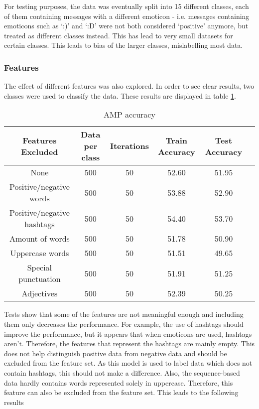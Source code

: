 \noindent For testing purposes, the data was eventually split into 15 different classes, each of them containing messages with a different emoticon - i.e. messages containing emoticons such as `:)' and `:D' were not both considered `positive' anymore, but treated as different classes instead. This has lead to very small datasets for certain classes. This leads to bias of the larger classes, mislabelling most data.


\subsubsection*{Features}

The effect of different features was also explored. In order to see clear results, two classes were used to classify the data. These results are displayed in table \ref{table:AMPfeatures}.

\begin{table}[h!]
\begin{center}
\begin{tabular}{| c | c | c | c | c | c |}
\hline
 {\textbf{Features Excluded}} 	 
 & {\textbf{Data per class}} 					& {\textbf{Iterations}} 
 & {\textbf{Train Accuracy}} 					& {\textbf{Test Accuracy}} 
 \\
\hline
None		&				500	&	50	&	52.60	& 	51.95	\\
Positive/negative words	&		500	&	50	&	53.88	&	52.90	\\
Positive/negative hashtags	&	500	&	50	&	54.40	&	53.70	\\
Amount of words	&		500	&	50	&	51.78	&	50.90	\\
Uppercase words	&		500	&	50	&	51.51	&	49.65	\\
Special punctuation	&	500	&	50	&	51.91	&	51.25	\\
Adjectives	&			500	&	50	&	52.39	&	50.25	\\
\hline
\end{tabular}
\caption{AMP accuracy}
\label{table:AMPfeatures}
\end{center}
\end{table}


Tests show that some of the features are not meaningful enough and including them only decreases the performance. For example, the use of hashtags should improve the performance, but it appears that when emoticons are used, hashtags aren't. Therefore, the features that represent the hashtags are mainly empty. This does not help distinguish positive data from negative data and should be excluded from the feature set. As this model is used to label data which does not contain hashtags, this should not make a difference. Also, the sequence-based data hardly contains words represented solely in uppercase. Therefore, this feature can also be excluded from the feature set. This leads to the following results

